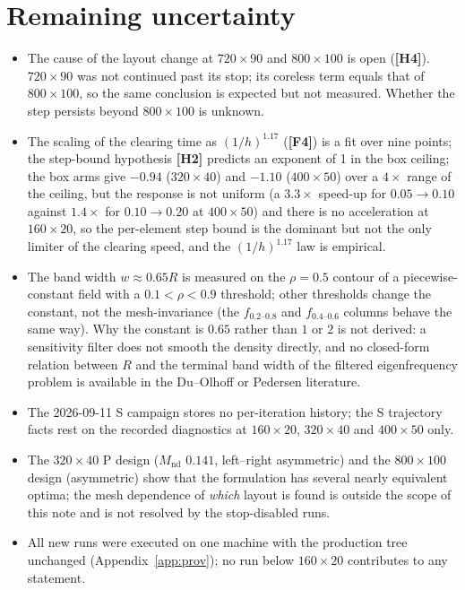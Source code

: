 \documentclass[10pt,a4paper]{article}
\newcommand{\Mnd}{M_{\mathrm{nd}}}
\newcommand{\fact}[1]{\textbf{[F#1]}}
\newcommand{\hyp}[1]{\textbf{[H#1]}}
\begin{document}
\section{Remaining uncertainty}\label{sec:unc}

\begin{itemize}
\item The cause of the layout change at $720\times90$ and $800\times100$ is open (\hyp{4}). $720\times90$ was not continued past its stop; its coreless term equals that of $800\times100$, so the same conclusion is expected but not measured. Whether the step persists beyond $800\times100$ is unknown.
\item The scaling of the clearing time as $(1/h)^{1.17}$ (\fact{4}) is a fit over nine points; the step-bound hypothesis \hyp{2} predicts an exponent of 1 in the box ceiling; the box arms give $-0.94$ ($320\times40$) and $-1.10$ ($400\times50$) over a $4\times$ range of the ceiling, but the response is not uniform (a $3.3\times$ speed-up for $0.05\to0.10$ against $1.4\times$ for $0.10\to0.20$ at $400\times50$) and there is no acceleration at $160\times20$, so the per-element step bound is the dominant but not the only limiter of the clearing speed, and the $(1/h)^{1.17}$ law is empirical.
\item The band width $w\approx0.65R$ is measured on the $\rho=0.5$ contour of a piecewise-constant field with a $0.1<\rho<0.9$ threshold; other thresholds change the constant, not the mesh-invariance (the $f_{0.2\text{--}0.8}$ and $f_{0.4\text{--}0.6}$ columns behave the same way). Why the constant is $0.65$ rather than $1$ or $2$ is not derived: a sensitivity filter does not smooth the density directly, and no closed-form relation between $R$ and the terminal band width of the filtered eigenfrequency problem is available in the Du--Olhoff or Pedersen literature.
\item The 2026-09-11 S campaign stores no per-iteration history; the S trajectory facts rest on the recorded diagnostics at $160\times20$, $320\times40$ and $400\times50$ only.
\item The $320\times40$ P design ($\Mnd$ $0.141$, left--right asymmetric) and the $800\times100$ design (asymmetric) show that the formulation has several nearly equivalent optima; the mesh dependence of \emph{which} layout is found is outside the scope of this note and is not resolved by the stop-disabled runs.
\item All new runs were executed on one machine with the production tree unchanged (Appendix~\ref{app:prov}); no run below $160\times20$ contributes to any statement.
\end{itemize}
\end{document}
